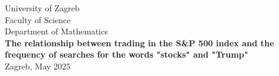 \documentclass[../main.tex]{subfiles}
\begin{document}
	
\begin{titlepage}
	\begin{center}
		\large{University of Zagreb\\Faculty of Science\\Department of Mathematics}\\[5cm]
		\Huge{\textbf{The relationship between trading in the S\&P 500 index and the frequency of searches for the words "stocks" and "Trump"}}\\[6cm]
		\large{Zagreb, May 2025}
	\end{center}
\end{titlepage}
	
	
	
	\newpage
	\tableofcontents
	
\end{document}
